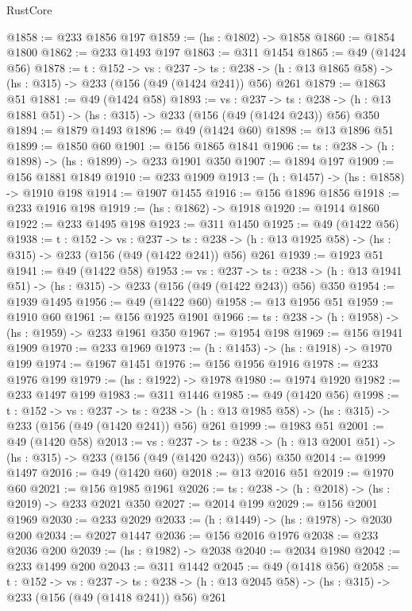 \begin{lexlean}{RustCore}
\begin{coremodule}
@1858 := @233 @1856 @197
@1859 := (hs : @1802) -> @1858
@1860 := @1854 @1800
@1862 := @233 @1493 @197
@1863 := @311 @1454
@1865 := @49 (@1424 @56)
@1878 := {t : @152} ->
  {vs : @237} ->
  {ts : @238} -> (h : @13 @1865 @58) -> (hs : @315) -> @233 (@156 (@49 (@1424 @241)) @56) @261
@1879 := @1863 @51
@1881 := @49 (@1424 @58)
@1893 := {vs : @237} ->
  {ts : @238} -> (h : @13 @1881 @51) -> (hs : @315) -> @233 (@156 (@49 (@1424 @243)) @56) @350
@1894 := @1879 @1493
@1896 := @49 (@1424 @60)
@1898 := @13 @1896 @51
@1899 := @1850 @60
@1901 := @156 @1865 @1841
@1906 := {ts : @238} -> (h : @1898) -> (hs : @1899) -> @233 @1901 @350
@1907 := @1894 @197
@1909 := @156 @1881 @1849
@1910 := @233 @1909
@1913 := (h : @1457) -> (hs : @1858) -> @1910 @198
@1914 := @1907 @1455
@1916 := @156 @1896 @1856
@1918 := @233 @1916 @198
@1919 := (hs : @1862) -> @1918
@1920 := @1914 @1860
@1922 := @233 @1495 @198
@1923 := @311 @1450
@1925 := @49 (@1422 @56)
@1938 := {t : @152} ->
  {vs : @237} ->
  {ts : @238} -> (h : @13 @1925 @58) -> (hs : @315) -> @233 (@156 (@49 (@1422 @241)) @56) @261
@1939 := @1923 @51
@1941 := @49 (@1422 @58)
@1953 := {vs : @237} ->
  {ts : @238} -> (h : @13 @1941 @51) -> (hs : @315) -> @233 (@156 (@49 (@1422 @243)) @56) @350
@1954 := @1939 @1495
@1956 := @49 (@1422 @60)
@1958 := @13 @1956 @51
@1959 := @1910 @60
@1961 := @156 @1925 @1901
@1966 := {ts : @238} -> (h : @1958) -> (hs : @1959) -> @233 @1961 @350
@1967 := @1954 @198
@1969 := @156 @1941 @1909
@1970 := @233 @1969
@1973 := (h : @1453) -> (hs : @1918) -> @1970 @199
@1974 := @1967 @1451
@1976 := @156 @1956 @1916
@1978 := @233 @1976 @199
@1979 := (hs : @1922) -> @1978
@1980 := @1974 @1920
@1982 := @233 @1497 @199
@1983 := @311 @1446
@1985 := @49 (@1420 @56)
@1998 := {t : @152} ->
  {vs : @237} ->
  {ts : @238} -> (h : @13 @1985 @58) -> (hs : @315) -> @233 (@156 (@49 (@1420 @241)) @56) @261
@1999 := @1983 @51
@2001 := @49 (@1420 @58)
@2013 := {vs : @237} ->
  {ts : @238} -> (h : @13 @2001 @51) -> (hs : @315) -> @233 (@156 (@49 (@1420 @243)) @56) @350
@2014 := @1999 @1497
@2016 := @49 (@1420 @60)
@2018 := @13 @2016 @51
@2019 := @1970 @60
@2021 := @156 @1985 @1961
@2026 := {ts : @238} -> (h : @2018) -> (hs : @2019) -> @233 @2021 @350
@2027 := @2014 @199
@2029 := @156 @2001 @1969
@2030 := @233 @2029
@2033 := (h : @1449) -> (hs : @1978) -> @2030 @200
@2034 := @2027 @1447
@2036 := @156 @2016 @1976
@2038 := @233 @2036 @200
@2039 := (hs : @1982) -> @2038
@2040 := @2034 @1980
@2042 := @233 @1499 @200
@2043 := @311 @1442
@2045 := @49 (@1418 @56)
@2058 := {t : @152} ->
  {vs : @237} ->
  {ts : @238} -> (h : @13 @2045 @58) -> (hs : @315) -> @233 (@156 (@49 (@1418 @241)) @56) @261

\end{coremodule}
\end{lexlean}
